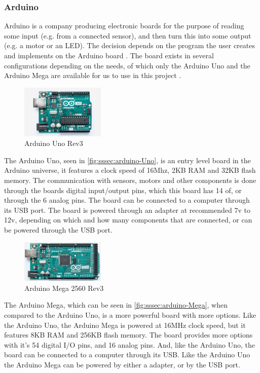 \subsubsection{Arduino}
Arduino is a company producing electronic boards for the purpose of reading some input (e.g. from a connected sensor), and then turn this into some output (e.g. a motor or an LED).
The decision depends on the program the user creates and implements on the Arduino board \cite{arduino_arduino_nodate}.
The board exists in several configurations depending on the needs, of which only the Arduino Uno and the Arduino Mega are available for us to use in this project \cite{arduino_arduino_products}.

\begin{figure}[H]
  \centering
  \includegraphics[width=4cm]{images/techAnalysis/ArduinoUno.jpg}
  \caption{Arduino Uno Rev3 \cite{Arduino-figure-UNO}}\label{fig:sssec:arduino-Uno}
\end{figure}
The Arduino Uno, seen in \autoref{fig:sssec:arduino-Uno}, is an entry level board in the Arduino universe, it features a clock speed of 16Mhz, 2KB RAM and 32KB flash memory.
The communication with sensors, motors and other components is done through the boards digital input/output pins, which this board has 14 of, or through the 6 analog pins.
The board can be connected to a computer through its USB port.
The board is powered through an adapter at recommended 7v to 12v, depending on which and how many components that are connected, or can be powered through the USB port. \cite{arduino_arduino_UNO}

\begin{figure}[H]
  \centering
  \includegraphics[width=4cm]{images/techAnalysis/ArduinoMega.jpg}
  \caption{Arduino Mega 2560 Rev3 \cite{Arduino-figure-MEGA}}\label{fig:sssec:arduino-Mega}
\end{figure}
The Arduino Mega, which can be seen in \autoref{fig:sssec:arduino-Mega}, when compared to the Arduino Uno, is a more powerful board with more options.
Like the Arduino Uno, the Arduino Mega is powered at 16MHz clock speed, but it features 8KB RAM and 256KB flash memory.
The board provides more options with it's 54 digital I/O pins, and 16 analog pins.
And, like the Arduino Uno, the board can be connected to a computer through its USB.
Like the Arduino Uno the Arduino Mega can be powered by either a adapter, or by the USB port. \cite{arduino_arduino_MEGA}
